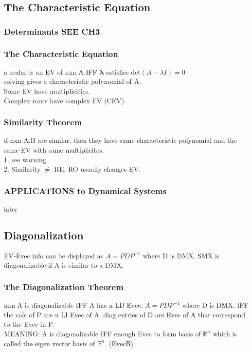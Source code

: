 \documentclass[12pt]{article}
\newcommand{\R}{\mathbb{R}}
\begin{document}
\subsection{The Characteristic Equation}
    \subsubsection{Determinants SEE CH3}
    \subsubsection{The Characteristic Equation}
        a scalar is an EV of nxn A IFF $\bm{\lambda }$  satisfies
        $\text{det}(A - \lambda I) = 0$ \\
        solving gives a characteristic polynomial of A.\\
        Some EV have multiplicities. \\
        Complex roots have complex EV (CEV).
    \subsubsection{Similarity Theorem}
        if nxn A,B are similar, then they have same
        characteristic polynomial and the same EV with same
        multiplicites.\\
        1. see warning \\
        2. Similarity $\ne $  RE, RO usually changes EV.
    \subsubsection{APPLICATIONS to Dynamical Systems}
        later
\subsection{Diagonalization}
    EV-Evec info can be displayed as $A = PDP^{-1}$  where D is DMX.
    SMX is diagonalizable if A is similar to a DMX.
    \subsubsection{The Diagonalization Theorem}
        nxn A is diagonalizable IFF A has n LD Evec.
        $A = PDP^{-1}$  where D is DMX, IFF the cols of P are n
        LI Evec of A. diag entries of D are Evec of A that correspond
        to the Evec in P. \\
        MEANING: A is diagonalizable IFF enough Evec to form 
        basis of $\R^n$  which is called the eigen vector basis of
        $\R^n$. (EvecB) 
\end{document}
